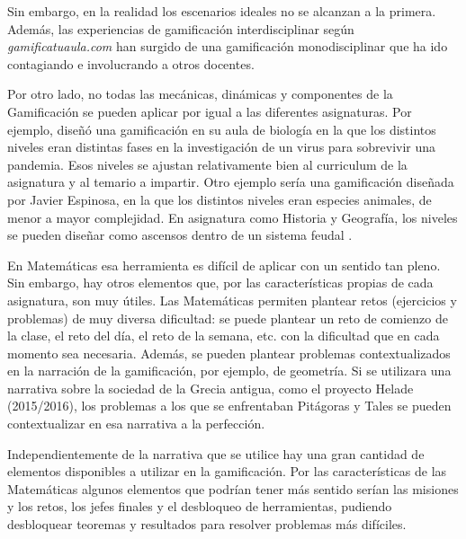 Sin embargo, en la realidad los escenarios ideales no se alcanzan a la primera.
%
Además, las experiencias de gamificación interdisciplinar según \textit{gamificatuaula.com} han surgido de una gamificación monodisciplinar que ha ido contagiando e involucrando a otros docentes.


Por otro lado, no todas las mecánicas, dinámicas y componentes de la Gamificación se pueden aplicar por igual a las diferentes asignaturas.
%
Por ejemplo, \cite{ClassAVideogame} diseñó una gamificación en su aula de biología en la que los distintos niveles eran distintas fases en la investigación de un virus para sobrevivir una pandemia.
%
Esos niveles se ajustan relativamente bien al curriculum de la asignatura y al temario a impartir.
%
Otro ejemplo sería una gamificación diseñada por Javier Espinosa, en la que los distintos niveles eran especies animales, de menor a mayor complejidad.
%
En asignatura como Historia y Geografía, los niveles se pueden diseñar como ascensos dentro de un sistema feudal \citep{Feudal}.

En Matemáticas esa herramienta es difícil de aplicar con un sentido tan pleno.
%
Sin embargo, hay otros elementos que, por las características propias de cada asignatura, son muy útiles.
%
Las Matemáticas permiten plantear retos (ejercicios y problemas) de muy diversa dificultad: se puede plantear un reto de comienzo de la clase, el reto del día, el reto de la semana, etc. con la dificultad que en cada momento sea necesaria.
%
Además, se pueden plantear problemas contextualizados en la narración de la gamificación, por ejemplo, de geometría.
%
Si se utilizara una narrativa sobre la sociedad de la Grecia antigua, como el proyecto Helade (2015/2016), los problemas a los que se enfrentaban Pitágoras y Tales se pueden contextualizar en esa narrativa a la perfección.


Independientemente de la narrativa que se utilice hay una gran cantidad de elementos disponibles a utilizar en la gamificación. 
%
Por las características de las Matemáticas algunos elementos que podrían tener más sentido serían las misiones y los retos, los jefes finales y el desbloqueo de herramientas, pudiendo desbloquear teoremas y resultados para resolver problemas más difíciles.
